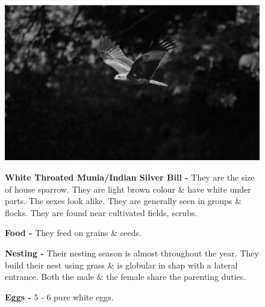 \begin{figure}[H]
\begin{center}
\includegraphics{figure/Land_birds/01_pariah_kite/pariah-kite.eps}
\end{center}
\medskip
\noindent
{\bf White Throated Munia/Indian Silver Bill -} They are the size of house sparrow. They are light brown colour \& have white under parts. The sexes look alike. They are generally seen in groups \& flocks. They are found near cultivated fields, scrubs. 

\medskip
{\bf Food -} They feed on grains \& seeds.

{\bf Nesting -} Their nesting season is almost throughout the year. They build their nest using grass \& is globular in shap with a lateral entrance. Both the male \& the female share the parenting duties.

{\bf Eggs -} 5 - 6 pure white eggs.
\end{figure}

\vfill\eject

~\phantom{a}
\vfill

